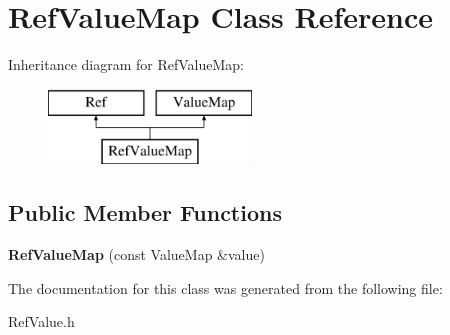 \hypertarget{class_ref_value_map}{}\section{Ref\+Value\+Map Class Reference}
\label{class_ref_value_map}
Inheritance diagram for Ref\+Value\+Map\+:\begin{figure}[H]
\begin{center}
\leavevmode
\includegraphics[height=2.000000cm]{d4/dfa/class_ref_value_map}
\end{center}
\end{figure}
\subsection*{Public Member Functions}
\begin{DoxyCompactItemize}
\item 
\mbox{\label{class_ref_value_map_a2d71da9a502b1e6c10e0ed69b6487724}} 
{\bfseries Ref\+Value\+Map} (const Value\+Map \&value)
\end{DoxyCompactItemize}


The documentation for this class was generated from the following file\+:\begin{DoxyCompactItemize}
\item 
Ref\+Value.\+h\end{DoxyCompactItemize}
